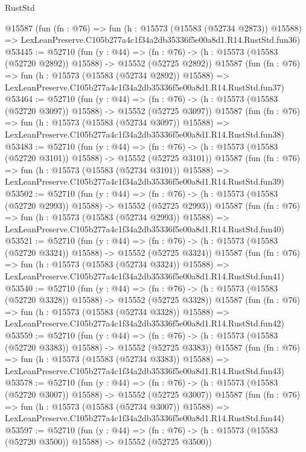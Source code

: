 \begin{lexlean}{RustStd}
\begin{coremodule}
    @15587
    (fun (fn : @76) =>
    fun (h : @15573 (@15583 (@52734 @2873)) @15588) =>
    LexLeanPreserve.C105b277a4c1f34a2db35336f5e00a8d1.R14.RustStd.fun36)
@53445 := @52710
    (fun (y : @44) =>
    (fn : @76) -> (h : @15573 (@15583 (@52720 @2892)) @15588) -> @15552 (@52725 @2892))
    @15587
    (fun (fn : @76) =>
    fun (h : @15573 (@15583 (@52734 @2892)) @15588) =>
    LexLeanPreserve.C105b277a4c1f34a2db35336f5e00a8d1.R14.RustStd.fun37)
@53464 := @52710
    (fun (y : @44) =>
    (fn : @76) -> (h : @15573 (@15583 (@52720 @3097)) @15588) -> @15552 (@52725 @3097))
    @15587
    (fun (fn : @76) =>
    fun (h : @15573 (@15583 (@52734 @3097)) @15588) =>
    LexLeanPreserve.C105b277a4c1f34a2db35336f5e00a8d1.R14.RustStd.fun38)
@53483 := @52710
    (fun (y : @44) =>
    (fn : @76) -> (h : @15573 (@15583 (@52720 @3101)) @15588) -> @15552 (@52725 @3101))
    @15587
    (fun (fn : @76) =>
    fun (h : @15573 (@15583 (@52734 @3101)) @15588) =>
    LexLeanPreserve.C105b277a4c1f34a2db35336f5e00a8d1.R14.RustStd.fun39)
@53502 := @52710
    (fun (y : @44) =>
    (fn : @76) -> (h : @15573 (@15583 (@52720 @2993)) @15588) -> @15552 (@52725 @2993))
    @15587
    (fun (fn : @76) =>
    fun (h : @15573 (@15583 (@52734 @2993)) @15588) =>
    LexLeanPreserve.C105b277a4c1f34a2db35336f5e00a8d1.R14.RustStd.fun40)
@53521 := @52710
    (fun (y : @44) =>
    (fn : @76) -> (h : @15573 (@15583 (@52720 @3324)) @15588) -> @15552 (@52725 @3324))
    @15587
    (fun (fn : @76) =>
    fun (h : @15573 (@15583 (@52734 @3324)) @15588) =>
    LexLeanPreserve.C105b277a4c1f34a2db35336f5e00a8d1.R14.RustStd.fun41)
@53540 := @52710
    (fun (y : @44) =>
    (fn : @76) -> (h : @15573 (@15583 (@52720 @3328)) @15588) -> @15552 (@52725 @3328))
    @15587
    (fun (fn : @76) =>
    fun (h : @15573 (@15583 (@52734 @3328)) @15588) =>
    LexLeanPreserve.C105b277a4c1f34a2db35336f5e00a8d1.R14.RustStd.fun42)
@53559 := @52710
    (fun (y : @44) =>
    (fn : @76) -> (h : @15573 (@15583 (@52720 @3383)) @15588) -> @15552 (@52725 @3383))
    @15587
    (fun (fn : @76) =>
    fun (h : @15573 (@15583 (@52734 @3383)) @15588) =>
    LexLeanPreserve.C105b277a4c1f34a2db35336f5e00a8d1.R14.RustStd.fun43)
@53578 := @52710
    (fun (y : @44) =>
    (fn : @76) -> (h : @15573 (@15583 (@52720 @3007)) @15588) -> @15552 (@52725 @3007))
    @15587
    (fun (fn : @76) =>
    fun (h : @15573 (@15583 (@52734 @3007)) @15588) =>
    LexLeanPreserve.C105b277a4c1f34a2db35336f5e00a8d1.R14.RustStd.fun44)
@53597 := @52710
    (fun (y : @44) =>
    (fn : @76) -> (h : @15573 (@15583 (@52720 @3500)) @15588) -> @15552 (@52725 @3500))

\end{coremodule}
\end{lexlean}
